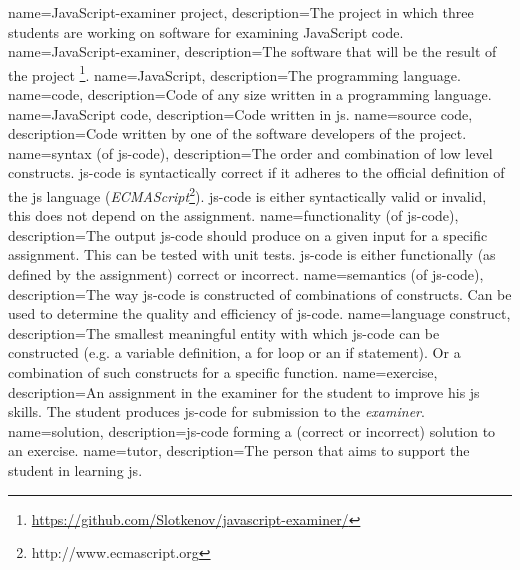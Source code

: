 {
  name=JavaScript-examiner project,
  description={The project in which three students are working
    on software for examining JavaScript code.}
}
{
  name=JavaScript-examiner,
  description={The software that will be the result of the \gls{project}
    \footnote{\url{https://github.com/Slotkenov/javascript-examiner/}}.}
}
{
  name=JavaScript,
  description={The programming language.}
}
{
  name=code,
  description={Code of any size written in a programming language.}
}
{
  name=JavaScript code,
  description={Code written in \gls{js}.}
}
{
  name=source code,
  description={Code written by one of the software developers
    of the \gls{project}.}
}
{
  name=syntax (of \gls{js-code}),
  description={The order and combination of low level \gls{constructs}.
    \gls{js-code} is syntactically correct if it adheres
    to the official definition of the \gls{js} language
    ({\em ECMAScript}\footnote{http://www.ecmascript.org}).
    \gls{js-code} is either syntactically valid or invalid,
    this does not depend on the assignment.}
}
{
  name=functionality (of \gls{js-code}),
  description={The output \gls{js-code} should produce
    on a given input for a specific assignment.
    This can be tested with unit tests.
    \Gls{js-code} is either functionally (as defined by the assignment)
    correct or incorrect.}
}
{
  name=semantics (of \gls{js-code}),
  description={The way \gls{js-code} is constructed
    of combinations of \gls{constructs}.
    Can be used to determine the quality and efficiency of \gls{js-code}.}
}
{
  name=language construct,
  description={The smallest meaningful entity
    with which \gls{js-code} can be constructed
    (e.g. a variable definition, a for loop or an if statement).
    Or a combination of such constructs for a specific function.}
}
{
  name=exercise,
  description={An assignment in the \gls{examiner} for the \gls{student}
    to improve his \gls{js} skills.
    The student produces \gls{js-code} for submission to the {\em examiner}.}
}
{
  name=solution,
  description={\Gls{js-code} forming a
    (correct or incorrect) solution to an exercise.}
}
{
  name=tutor,
  description={The person that aims to support the \gls{student}
    in learning \gls{js}.}
}
